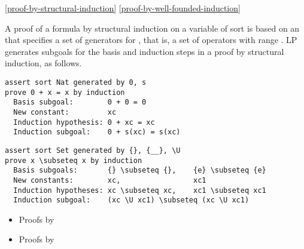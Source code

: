 \ref{proof-by-structural-induction}
\ref{proof-by-well-founded-induction}

A proof of a formula  by structural induction on a variable  of
sort  is based on an  that
specifies a set  of generators for , that is, a set of operators
with range .  LP generates subgoals for the basis and induction steps in
a proof by structural induction, as follows.

\begin{verbatim}
assert sort Nat generated by 0, s
prove 0 + x = x by induction
  Basis subgoal:        0 + 0 = 0
  New constant:         xc
  Induction hypothesis: 0 + xc = xc
  Induction subgoal:    0 + s(xc) = s(xc)
\end{verbatim}
\begin{verbatim}
assert sort Set generated by {}, {__}, \U
prove x \subseteq x by induction
  Basis subgoals:       {} \subseteq {},    {e} \subseteq {e}
  New constants:        xc,                 xc1
  Induction hypotheses: xc \subseteq xc,    xc1 \subseteq xc1
  Induction subgoal:    (xc \U xc1) \subseteq (xc \U xc1)
\end{verbatim}

\begin{itemize}
\item Proofs by 
\item Proofs by 
\end{itemize}
